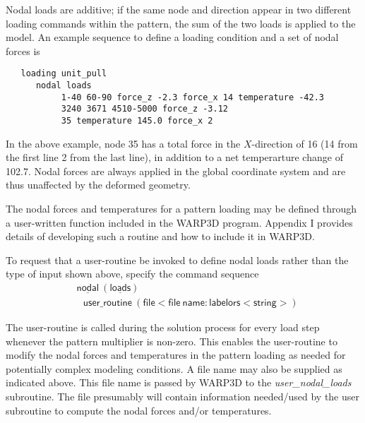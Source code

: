 \documentclass[11pt]{report}
\numberwithin{equation}{section}
\newcommand{\noi}{\noindent}
\newcommand{\ul} {\underline}
\newcommand{\hv} {\mathsf}   %
\newcommand{\ti}{\emph}
\begin{document}
\noi Nodal loads are additive; if the same node and direction appear 
in two different loading commands within the pattern, the sum 
of the two loads is applied to the model. An example
sequence to define a loading condition and a set of nodal forces is

\small
\begin{verbatim}
   loading unit_pull
      nodal loads
           1-40 60-90 force_z -2.3 force_x 14 temperature -42.3
           3240 3671 4510-5000 force_z -3.12
           35 temperature 145.0 force_x 2
 \end{verbatim}
\normalsize

\noi In the above example, node 35 has a total force in the $X$-direction of
16 (14 from the first line 2 from the last line), in addition to a net temperarture
change of 102.7.
Nodal forces are always applied in the global coordinate system and are thus unaffected
by the deformed geometry.


\noi {\bf{\ti{User-Defined Nodal Loads Routine}}}

\noi The nodal forces and temperatures for a pattern loading may be defined through
a user-written function included in the WARP3D program. Appendix I provides
details of developing such a routine and how to include it in WARP3D.

To request that a user-routine be invoked to define nodal loads
rather than the type of input shown above, specify the command 
sequence 
\begin{align*}
& \hv{\ul{nodal}\ (\ul{loads})} \\
&\ \ \ \hv{user\_routine\ (file <file\ name:label or s<string>)}
\end{align*}

\noi The user-routine is called during the solution process for every load step
whenever the pattern multiplier is non-zero. This enables the user-routine to
modify the nodal forces and temperatures in the pattern loading as needed
for potentially complex modeling conditions. A file name may also be supplied as
indicated above. This file name is passed by 
WARP3D to the \ti{user\_nodal\_loads} subroutine. The file presumably will contain information
needed/used by the user subroutine to compute the nodal forces and/or temperatures.

\end{document}
